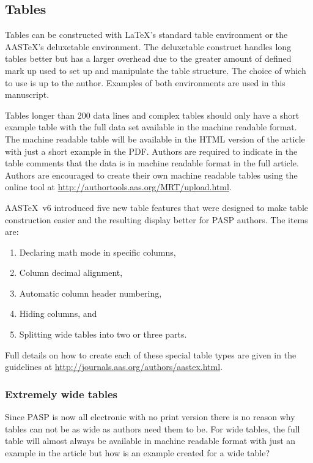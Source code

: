 \documentclass[linenumbers,trackchanges]{aastex701}
\newcommand\aastex{AAS\TeX}
\newcommand\latex{La\TeX}
\begin{document}
\subsection{Tables} \label{subsec:tables}

Tables can be constructed with \latex's standard table environment or the \aastex's deluxetable environment. The deluxetable construct handles long tables better but has a larger overhead due to the greater amount of defined mark up used to set up and manipulate the table structure.  The choice of which to use is up to the author.  Examples of both environments are used in this manuscript. 

Tables longer than 200 data lines and complex tables should only have a short example table with the full data set available in the machine readable format.  The machine readable table will be available in the HTML version of the article with just a short example in the PDF. Authors are required to indicate in the table comments that the data is in machine readable format in the full article.  Authors are encouraged to create their own machine readable tables using the online tool at \url{http://authortools.aas.org/MRT/upload.html}.

\aastex\ v6 introduced five new table features that were designed to make
table construction easier and the resulting display better for PASP
authors. The items are:

\begin{enumerate}
\item Declaring math mode in specific columns,
\item Column decimal alignment, 
\item Automatic column header numbering,
\item Hiding columns, and
\item Splitting wide tables into two or three parts.
\end{enumerate}

Full details on how to create each of these special table types are given in the guidelines at \url{http://journals.aas.org/authors/aastex.html}.

\subsubsection{Extremely wide tables}

Since PASP is now all electronic with no print version there is no reason why tables can not be as wide as authors need them to be. For wide tables, the full table will almost always be available in machine readable format with just an example in the article but how is an example created for a wide table?
\end{document}
